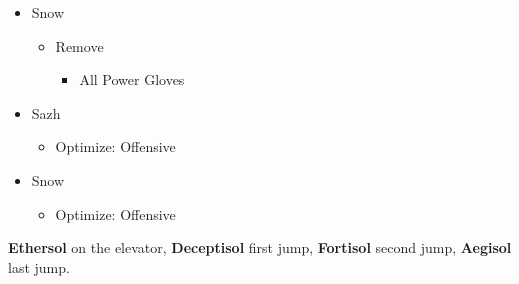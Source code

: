 \begin{menu}
\begin{multicols}{2}
\begin{itemize}
    \columnbreak
    \equip
    \begin{itemize}
        \item Snow
        \begin{itemize}
            \item Remove
            \begin{itemize}
                \item All Power Gloves
            \end{itemize}
        \end{itemize}
        \item Sazh
        \begin{itemize}
            \item Optimize: Offensive
        \end{itemize}
        \item Snow
        \begin{itemize}
            \item Optimize: Offensive
        \end{itemize}
    \end{itemize}
\end{itemize}
\end{multicols}
\end{menu}
\textbf{Ethersol} on the elevator, \textbf{Deceptisol} first jump, \textbf{Fortisol} second jump, \textbf{Aegisol} last jump.
\renewcommand{\first}{[1] Tireless Charge (\com/\com/\med)}
\renewcommand{\second}{[2] Cerberus (\com/\com/\com)}
\renewcommand{\third}{[3] Thaumaturgy (\rav/\rav/\med)}
\renewcommand{\fourth}{[4] Relentless Assault (\com/\rav/\rav)}
\renewcommand{\fifth}{[5] Smart Bomb (\rav/\rav/\sab)}
\renewcommand{\sixth}{[6] Tri-Disaster (\rav/\rav/\rav)}
